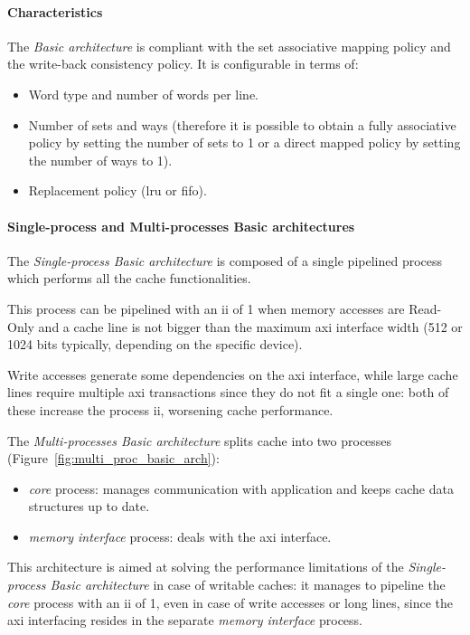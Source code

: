 \documentclass[11pt,a4paper,oneside]{memoir}
\begin{document}
\paragraph{Characteristics}
The \emph{Basic architecture} is compliant with the set associative mapping
policy and the write-back consistency policy.
It is configurable in terms of:
\begin{itemize}
	\item Word type and number of words per line.
	\item Number of sets and ways (therefore it is possible to obtain a
		fully associative policy by setting the number of sets to 1 or
		a direct mapped policy by setting the number of ways to 1).
	\item Replacement policy (\acl{lru} or \acl{fifo}).
\end{itemize}

\paragraph{Single-process and Multi-processes Basic architectures}
The \emph{Single-process Basic architecture} is composed of a single pipelined
process which performs all the cache functionalities.

This process can be pipelined with an \ac{ii} of 1 when memory accesses are
Read-Only and a cache line is not bigger than the maximum \ac{axi} interface
width (512 or 1024 bits typically, depending on the specific device).

Write accesses generate some dependencies on the \ac{axi} interface, while large
cache lines require multiple \ac{axi} transactions since they do not fit a
single one: both of these increase the process \ac{ii}, worsening cache
performance.

\bigskip
The \emph{Multi-processes Basic architecture} splits cache into two processes
(Figure~\ref{fig:multi_proc_basic_arch}):
\begin{itemize}
	\item \emph{core} process: manages communication with application and
		keeps cache data structures up to date.
	\item \emph{memory interface} process: deals with the \ac{axi}
		interface.
\end{itemize}

This architecture is aimed at solving the performance limitations of the
\emph{Single-process Basic architecture} in case of writable caches: it manages
to pipeline the \emph{core} process with an \ac{ii} of 1, even in case of write
accesses or long lines, since the \ac{axi} interfacing resides in the separate
\emph{memory interface} process.
\end{document}
